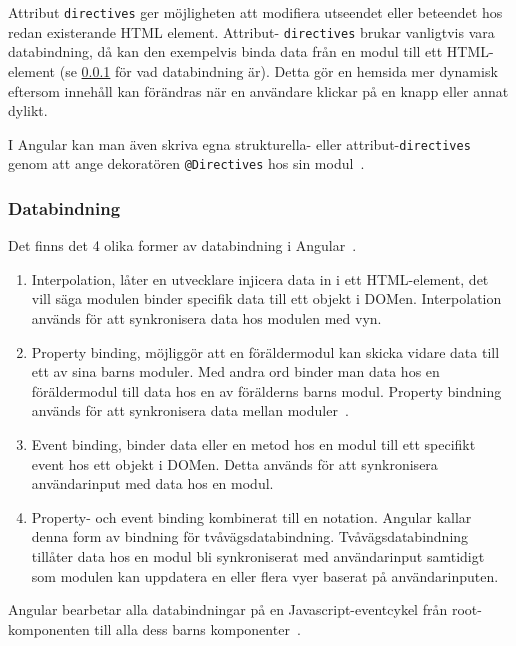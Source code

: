Attribut \texttt{directives} ger möjligheten att modifiera utseendet eller beteendet hos redan existerande HTML element. Attribut- \texttt{directives} brukar vanligtvis vara databindning, då kan den exempelvis binda data från en modul till ett HTML-element (se \ref{angular-data-binding} för vad databindning är). Detta gör en hemsida mer dynamisk eftersom innehåll kan förändras när en användare klickar på en knapp eller annat dylikt.

I Angular kan man även skriva egna strukturella- eller attribut-\texttt{directives} genom att ange dekoratören \texttt{@Directives} hos sin modul~\cite{angular-components}.

\subsubsection{Databindning}
\label{angular-data-binding}
Det finns det 4 olika former av databindning i Angular~\cite{angular-components}. 
\begin{enumerate}
    \item Interpolation, låter en utvecklare injicera data in i ett HTML-element, det vill säga modulen binder specifik data till ett objekt i DOMen. Interpolation används för att synkronisera data hos modulen med vyn.
    
    \item Property binding, möjliggör att en föräldermodul kan skicka vidare data till ett av sina barns moduler. Med andra ord binder man data hos en föräldermodul till data hos en av förälderns barns modul. Property bindning används för att synkronisera data mellan moduler~\cite{angular-databinding}.

    \item Event binding, binder data eller en metod hos en modul till ett specifikt event hos ett objekt i DOMen. Detta används för att synkronisera användarinput med data hos en modul.

    \item Property- och event binding kombinerat till en notation. Angular kallar denna form av bindning för tvåvägsdatabindning. Tvåvägsdatabindning tillåter data hos en modul bli synkroniserat med användarinput samtidigt som modulen kan uppdatera en eller flera vyer baserat på användarinputen.

\end{enumerate}

Angular bearbetar alla databindningar på en Javascript-eventcykel från root-komponenten till alla dess barns komponenter~\cite{angular-components}.


